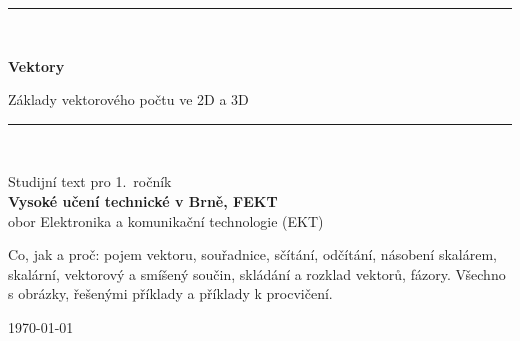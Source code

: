 \documentclass[a4paper,11pt]{article}
\begin{document}
\begin{titlepage}
\centering
\vspace*{1.5cm}
{\color{primary}\rule{\textwidth}{2.5pt}}\\[0.8cm]
{\fontsize{46}{52}\selectfont\bfseries\color{primary} Vektory\par}
\vspace{0.4cm}
{\Large\color{primary!80!black} Základy vektorového počtu ve 2D a 3D\par}
\vspace{0.5cm}
{\color{primary}\rule{\textwidth}{2.5pt}}\\[1.2cm]


\vspace{1.4cm}
\begin{tcolorbox}[enhanced,colback=primary!5,colframe=primary!40,boxrule=0.6pt,arc=2mm,width=0.85\textwidth]
\centering\large
Studijní text pro 1.~ročník\\[2pt]
\textbf{Vysoké učení technické v Brně, FEKT}\\[2pt]
obor Elektronika a komunikační technologie (EKT)
\end{tcolorbox}

\vspace{1cm}
\begin{minipage}{0.8\textwidth}
\centering\normalsize
Co, jak a proč: pojem vektoru, souřadnice, sčítání, odčítání, násobení skalárem,
skalární, vektorový a smíšený součin, skládání a rozklad vektorů,
fázory. Všechno s obrázky, řešenými příklady a příklady k procvičení.
\end{minipage}

\vfill
{\large\today}
\end{titlepage}

\tableofcontents
\clearpage
{}
\end{document}
